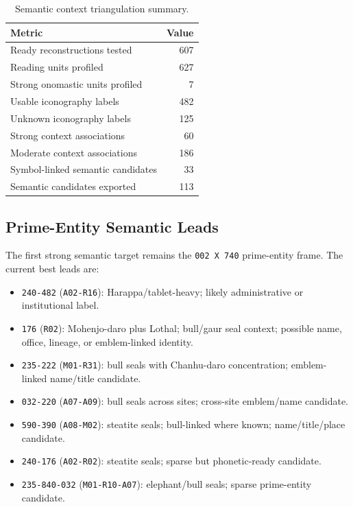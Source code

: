 \begin{table}[htbp]
\centering
\begin{tabular}{lr}
\toprule
\textbf{Metric} & \textbf{Value} \\
\midrule
Ready reconstructions tested & 607 \\
Reading units profiled & 627 \\
Strong onomastic units profiled & 7 \\
Usable iconography labels & 482 \\
Unknown iconography labels & 125 \\
Strong context associations & 60 \\
Moderate context associations & 186 \\
Symbol-linked semantic candidates & 33 \\
Semantic candidates exported & 113 \\
\bottomrule
\end{tabular}
\caption{Semantic context triangulation summary.}
\label{tab:semantic-context-summary}
\end{table}

\subsection{Prime-Entity Semantic Leads}

The first strong semantic target remains the \texttt{002 X 740} prime-entity frame. The current best leads are:

\begin{itemize}
  \item \texttt{240-482} (\texttt{A02-R16}): Harappa/tablet-heavy; likely administrative or institutional label.
  \item \texttt{176} (\texttt{R02}): Mohenjo-daro plus Lothal; bull/gaur seal context; possible name, office, lineage, or emblem-linked identity.
  \item \texttt{235-222} (\texttt{M01-R31}): bull seals with Chanhu-daro concentration; emblem-linked name/title candidate.
  \item \texttt{032-220} (\texttt{A07-A09}): bull seals across sites; cross-site emblem/name candidate.
  \item \texttt{590-390} (\texttt{A08-M02}): steatite seals; bull-linked where known; name/title/place candidate.
  \item \texttt{240-176} (\texttt{A02-R02}): steatite seals; sparse but phonetic-ready candidate.
  \item \texttt{235-840-032} (\texttt{M01-R10-A07}): elephant/bull seals; sparse prime-entity candidate.
\end{itemize}

